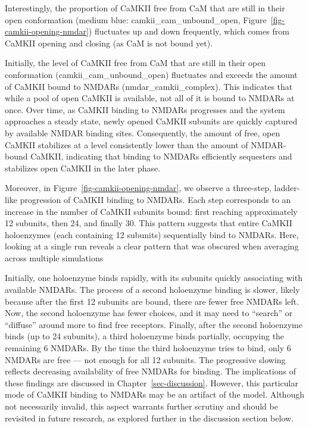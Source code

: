 \documentclass[
  11pt,
  letterpaper,
]{scrreprt}
\begin{document}
Interestingly, the proportion of CaMKII free from CaM that are still in
their open conformation (medium blue: camkii\_cam\_unbound\_open,
Figure~\ref{fig-camkii-opening-nmdar}) fluctuates up and down
frequently, which comes from CaMKII opening and closing (as CaM is not
bound yet).

Initially, the level of CaMKII free from CaM that are still in their
open conformation (camkii\_cam\_unbound\_open) fluctuates and exceeds
the amount of CaMKII bound to NMDARs (nmdar\_camkii\_complex). This
indicates that while a pool of open CaMKII is available, not all of it
is bound to NMDARs at once. Over time, as CaMKII binding to NMDARs
progresses and the system approaches a steady state, newly opened CaMKII
subunits are quickly captured by available NMDAR binding sites.
Consequently, the amount of free, open CaMKII stabilizes at a level
consistently lower than the amount of NMDAR-bound CaMKII, indicating
that binding to NMDARs efficiently sequesters and stabilizes open CaMKII
in the later phase.

Moreover, in Figure~\ref{fig-camkii-opening-nmdar}, we observe a
three-step, ladder-like progression of CaMKII binding to NMDARs. Each
step corresponds to an increase in the number of CaMKII subunits bound:
first reaching approximately 12 subunits, then 24, and finally 30. This
pattern suggests that entire CaMKII holoenzymes (each containing 12
subunits) sequentially bind to NMDARs. Here, looking at a single run
reveals a clear pattern that was obscured when averaging across multiple
simulations

Initially, one holoenzyme binds rapidly, with its subunits quickly
associating with available NMDARs. The process of a second holoenzyme
binding is slower, likely because after the first 12 subunits are bound,
there are fewer free NMDARs left. Now, the second holoenzyme has fewer
choices, and it may need to ``search'' or ``diffuse'' around more to
find free receptors. Finally, after the second holoenzyme binds (up to
24 subunits), a third holoenzyme binds partially, occupying the
remaining 6 NMDARs. By the time the third holoenzyme tries to bind, only
6 NMDARs are free --- not enough for all 12 subunits. The progressive
slowing reflects decreasing availability of free NMDARs for binding. The
implications of these findings are discussed in
Chapter~\ref{sec-discussion}. However, this particular mode of CaMKII
binding to NMDARs may be an artifact of the model. Although not
necessarily invalid, this aspect warrants further scrutiny and should be
revisited in future research, as explored further in the discussion
section below.
\end{document}
